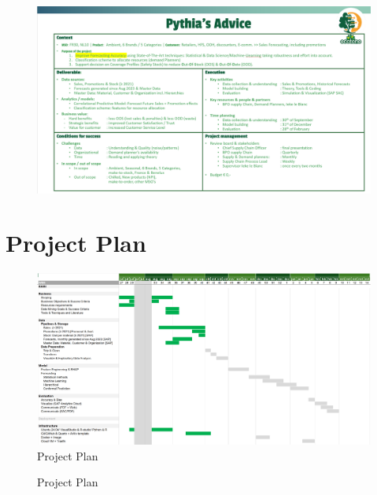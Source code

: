 \documentclass[
  american,
  10,
  a4paper,
]{book}
\theoremstyle{definition}
\theoremstyle{remark}
\begin{document}
\begin{landscape}
\begin{figure}[H]
{\centering \includegraphics[width=1\linewidth,height=\textheight,keepaspectratio]{nb/../images/project_charter.png}

}

\end{figure}%

\section{Project Plan}\label{sec-project-plan}

\begin{figure}[H]

\caption{Project Plan}

{\centering \includegraphics[width=1\linewidth,height=\textheight,keepaspectratio]{nb/../images/project_plan.png}

}

\end{figure}%

\newpage{}

\begin{figure}[H]

\caption{Project Plan}


\end{figure}
\end{landscape}
\end{document}
